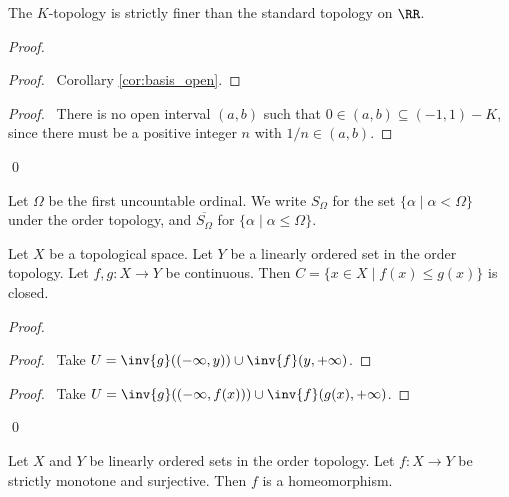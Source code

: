 \begin{lemma}
    The $K$-topology is strictly finer than the standard topology on $\RR$.
\end{lemma}

\begin{proof}
    \pf
    \begin{proof}
        \pf\ Corollary \ref{cor:basis_open}.
    \end{proof}
    \begin{proof}
        \pf\ There is no open interval $(a,b)$ such that $0 \in (a,b) \subseteq (-1,1) - K$, since
        there must be a positive integer $n$ with $1/n \in (a,b)$.
    \end{proof}
    \qed
\end{proof}

\begin{definition}
    Let $\Omega$ be the first uncountable ordinal. We write $S_\Omega$ for the set $\{ \alpha \mid \alpha < \Omega \}$
    under the order topology, and $\overline{S_\Omega}$ for $\{ \alpha \mid \alpha \leq \Omega \}$.
\end{definition}

\begin{lemma}
    \label{lemma:order_topology_closed}
    Let $X$ be a topological space.
    Let $Y$ be a linearly ordered set in the order topology. Let $f, g : X \rightarrow Y$ be continuous. Then $C = \{ x \in X \mid f(x) \leq g(x) \}$ is closed.
\end{lemma}

\begin{proof}
    \pf
    \begin{proof}
        \pf\ Take $U = \inv{g}((-\infty, y)) \cup \inv{f}(y,+\infty)$.
    \end{proof}
    \begin{proof}
        \pf\ Take $U = \inv{g}((-\infty, f(x))) \cup \inv{f}(g(x),+\infty)$.
    \end{proof}
    \qed
\end{proof}

\begin{proposition}
    \label{proposition:homeomorphism_order_topology}
    Let $X$ and $Y$ be linearly ordered sets in the order topology. Let $f : X \rightarrow Y$ be strictly monotone and surjective. Then $f$ is a homeomorphism.
\end{proposition}

